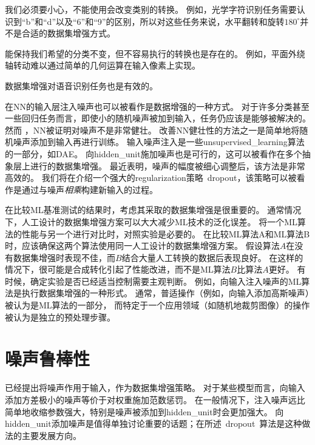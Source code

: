 我们必须要小心，不能使用会改变类别的转换。
例如，光学字符识别任务需要认识到``b''和``d''以及``6''和``9''的区别，所以对这些任务来说，水平翻转和旋转$180^{\circ}$并不是合适的数据集增强方式。


能保持我们希望的分类不变，但不容易执行的转换也是存在的。
例如，平面外绕轴转动难以通过简单的几何运算在输入像素上实现。

数据集增强对语音识别任务也是有效的\citep{Jaitly-Hinton-2013}。

在\gls{NN}的输入层注入噪声\citep{Sietsma-Dow-1991}也可以被看作是数据增强的一种方式。
对于许多分类甚至一些回归任务而言，即使小的随机噪声被加到输入，任务仍应该是能够被解决的。
然而 ，\gls{NN}被证明对噪声不是非常健壮\citep{Tang-Eliasmith-2010}。
改善\gls{NN}健壮性的方法之一是简单地将随机噪声添加到输入再进行训练。
输入噪声注入是一些\gls{unsupervised_learning}算法的一部分，如\gls{DAE}\citep{Vincent-et-al-2008}。
向\gls{hidden_unit}施加噪声也是可行的，这可以被看作在多个抽象层上进行的数据集增强。
\cite{Poole-et-al-2014}最近表明，噪声的幅度被细心调整后，该方法是非常高效的。
我们将在介绍一个强大的\gls{regularization}策略~\gls{dropout}，该策略可以被看作是通过与噪声\emph{相乘}构建新输入的过程。

在比较\gls{ML}基准测试的结果时，考虑其采取的数据集增强是很重要的。
通常情况下，人工设计的数据集增强方案可以大大减少\gls{ML}技术的泛化误差。
将一个\gls{ML}算法的性能与另一个进行对比时，对照实验是必要的。
在比较\gls{ML}算法A和\gls{ML}算法B时，应该确保这两个算法使用同一人工设计的数据集增强方案。
假设算法$A$在没有数据集增强时表现不佳，而$B$结合大量人工转换的数据后表现良好。
在这样的情况下，很可能是合成转化引起了性能改进，而不是\gls{ML}算法$B$比算法$A$更好。 
有时候，确定实验是否已经适当控制需要主观判断。
例如，向输入注入噪声的\gls{ML}算法是执行数据集增强的一种形式。
通常，普适操作（例如，向输入添加高斯噪声）被认为是\gls{ML}算法的一部分，
而特定于一个应用领域（如随机地裁剪图像）的操作被认为是独立的预处理步骤。


\section{噪声鲁棒性}
\label{sec:noise_robustness}

已经提出将噪声作用于输入，作为数据集增强策略。
对于某些模型而言，向输入添加方差极小的噪声等价于对权重施加范数惩罚\citep{Bishop-1995a,Bishop-1995b}。
在一般情况下，注入噪声远比简单地收缩参数强大，特别是噪声被添加到\gls{hidden_unit}时会更加强大。
向\gls{hidden_unit}添加噪声是值得单独讨论重要的话题；在所述~\gls{dropout}~算法是这种做法的主要发展方向。


